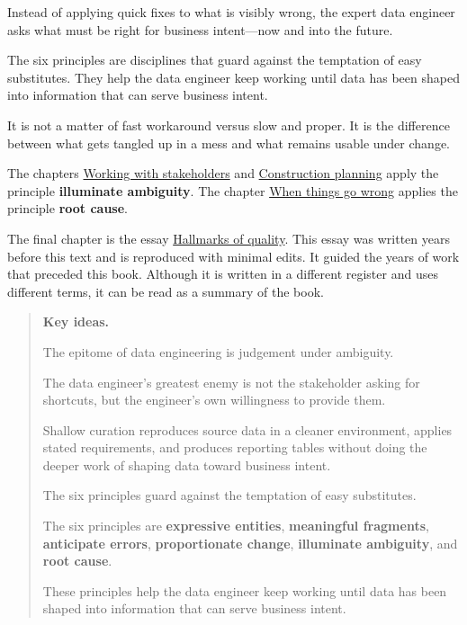 \documentclass[10pt,openany,10pt]{book}
\begin{document}
Instead of applying quick fixes to what is visibly wrong, the expert
data engineer asks what must be right for business intent---now and into
the future.

The six principles are disciplines that guard against the temptation of
easy substitutes. They help the data engineer keep working until data
has been shaped into information that can serve business intent.

It is not a matter of fast workaround versus slow and proper. It is the
difference between what gets tangled up in a mess and what remains
usable under change.

The chapters
\hyperref[docs-judgement-under-ambiguity-working-with-stakeholders]{Working
with stakeholders} and
\hyperref[docs-judgement-under-ambiguity-construction-planning]{Construction
planning} apply the principle \textbf{illuminate ambiguity}. The chapter
\hyperref[docs-judgement-under-ambiguity-when-things-go-wrong]{When
things go wrong} applies the principle \textbf{root cause}.

The final chapter is the essay
\hyperref[docs-judgement-under-ambiguity-closing-essay-hallmarks-of-quality]{Hallmarks
of quality}. This essay was written years before this text and is
reproduced with minimal edits. It guided the years of work that preceded
this book. Although it is written in a different register and uses
different terms, it can be read as a summary of the book.

\begin{quote}
\textbf{Key ideas.}

The epitome of data engineering is judgement under ambiguity.

The data engineer's greatest enemy is not the stakeholder asking for
shortcuts, but the engineer's own willingness to provide them.

Shallow curation reproduces source data in a cleaner environment,
applies stated requirements, and produces reporting tables without doing
the deeper work of shaping data toward business intent.

The six principles guard against the temptation of easy substitutes.

The six principles are \textbf{expressive entities}, \textbf{meaningful
fragments}, \textbf{anticipate errors}, \textbf{proportionate change},
\textbf{illuminate ambiguity}, and \textbf{root cause}.

These principles help the data engineer keep working until data has been
shaped into information that can serve business intent.
\end{quote}
\end{document}
